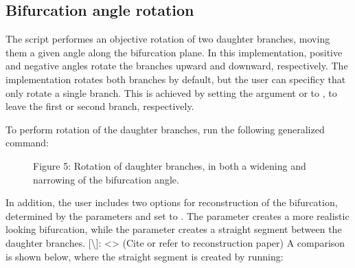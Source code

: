 \documentclass[letterpaper,10pt,english]{sphinxmanual}
\begin{document}
\subsection{Bifurcation angle rotation}
\label{\detokenize{getting_started:bifurcation-angle-rotation}}
The script  performes an objective rotation of two daughter branches, moving them a given angle along the bifurcation plane.
In this implementation, positive and negative angles rotate the branches upward and downward, respectively.
The implementation rotates both branches by default, but the user can specificy that only rotate a single branch.
This is achieved by setting the argument  or  to , to leave the first or second branch, respectively.

To perform rotation of the daughter branches, run the following generalized command:

%
\begin{sphinxVerbatim}[commandchars=\\\{\}]
   \PYG{p}{[}\PYG{p}{]}  \PYG{p}{[}\PYG{p}{]}  \PYG{p}{[}\PYG{p}{]}  
\end{sphinxVerbatim}

\begin{figure}[htbp]
\centering
\capstart

\noindent{}
\caption{Figure 5: Rotation of daughter branches, in both a widening and narrowing of the bifurcation angle.}\label{\detokenize{getting_started:id5}}\end{figure}

In addition, the user includes two options for reconstruction of the bifurcation, determined by the parameters  and  set to .
The  parameter creates a more realistic looking bifurcation, while the  parameter creates a straight segment between the daughter branches.
{[}\textbackslash{}{]}: \textless{}\textgreater{} (Cite or refer to reconstruction paper)
A comparison is shown below, where the straight segment is created by running:
\end{document}

